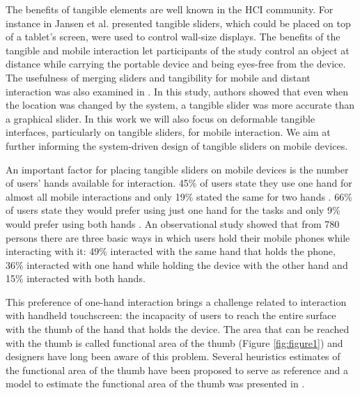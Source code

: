 \documentclass{sigchi}
\begin{document}
The benefits of tangible elements are well known in the HCI community. For instance in \cite{Jansen:2012:TRC:2207676.2208691} Jansen et al. presented tangible sliders, which could be placed on top of a tablet’s screen, were used to control wall-size displays. The benefits of the tangible and mobile interaction let participants of the study control an object at distance while carrying the portable device and being eyes-free from the device. The usefulness of merging sliders and tangibility for mobile and distant interaction was also examined in \cite{unpublished}. In this study, authors showed that even when the location was changed by the system, a tangible slider was more accurate than a graphical slider. In this work we will also focus on deformable tangible interfaces, particularly on tangible sliders, for mobile interaction. We aim at further informing the system-driven design of tangible sliders on mobile devices. 

An important factor for placing tangible sliders on mobile devices is the number of users’ hands available for interaction. 45\% of users state they use one hand for almost all mobile interactions and only 19\% stated the same for two hands \cite{Karlson06}. 66\% of users state they would prefer using just one hand for the tasks and only 9\% would prefer using both hands \cite{Karlson06}. An observational study \cite{hoober13} showed that from 780 persons there are three basic ways in which users hold their mobile phones while interacting with it: 49\% interacted with the same hand that holds the phone, 36\% interacted with one hand while holding the device with the other hand and 15\% interacted with both hands. 

This preference of one-hand interaction brings a challenge related to interaction with handheld touchscreen: the incapacity of users to reach the entire surface with the thumb of the hand that holds the device. The area that can be reached with the thumb is called functional area of the thumb (Figure \ref{fig:figure1}) and designers have long been aware of this problem. Several heuristics estimates of the functional area of the thumb have been proposed \cite{hoober13,Clark,Curtis,Wroblewski} to serve as reference and a model to estimate the functional area of the thumb was presented in \cite{Bergstrom-Lehtovirta:2014:MFA:2611528.2557354}.
\end{document}

